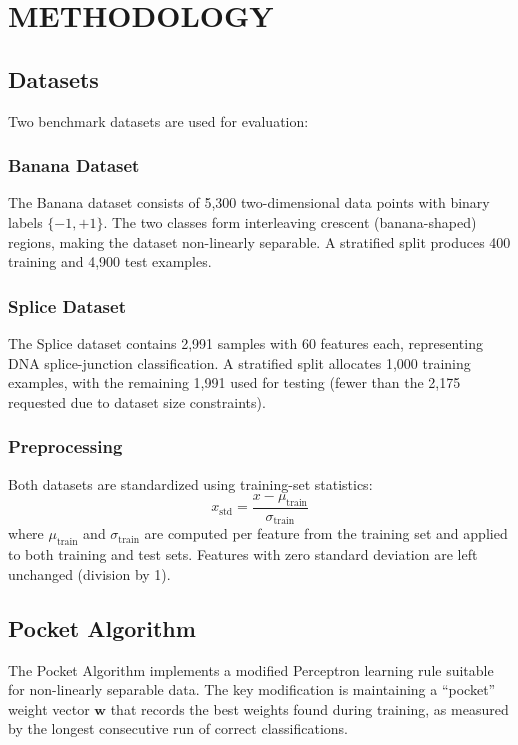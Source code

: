 \documentclass{acm_proc_article-sp}
\begin{document}
\section{METHODOLOGY}

\subsection{Datasets}

Two benchmark datasets are used for evaluation:

\subsubsection{Banana Dataset}
The Banana dataset consists of 5,300 two-dimensional data points with binary labels $\{-1, +1\}$. The two classes form interleaving crescent (banana-shaped) regions, making the dataset non-linearly separable. A stratified split produces 400 training and 4,900 test examples.

\subsubsection{Splice Dataset}
The Splice dataset contains 2,991 samples with 60 features each, representing DNA splice-junction classification. A stratified split allocates 1,000 training examples, with the remaining 1,991 used for testing (fewer than the 2,175 requested due to dataset size constraints).

\subsubsection{Preprocessing}
Both datasets are standardized using training-set statistics:
\begin{equation}
x_{\text{std}} = \frac{x - \mu_{\text{train}}}{\sigma_{\text{train}}}
\end{equation}
where $\mu_{\text{train}}$ and $\sigma_{\text{train}}$ are computed per feature from the training set and applied to both training and test sets. Features with zero standard deviation are left unchanged (division by 1).

\subsection{Pocket Algorithm}

The Pocket Algorithm implements a modified Perceptron learning rule suitable for non-linearly separable data. The key modification is maintaining a ``pocket'' weight vector $\mathbf{w}$ that records the best weights found during training, as measured by the longest consecutive run of correct classifications.
\end{document}
